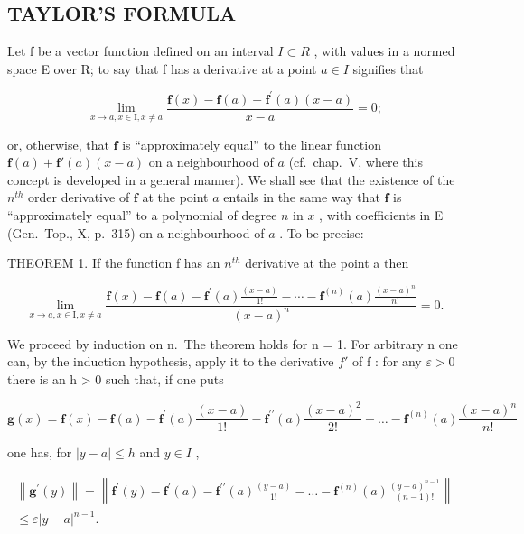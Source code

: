 \subsection{TAYLOR'S FORMULA}

Let f be a vector function defined on an interval \(I \subset R\) , with values in a normed space E over R; to say that f has a derivative at a point \(a \in I\) signifies that

\[
\lim _ {x \to a, x \in \mathrm{I}, x \neq a} \frac {\mathbf {f} (x) - \mathbf {f} (a) - \mathbf {f} ^ {\prime} (a) (x - a)}{x - a} = 0;\tag{6}
\]

or, otherwise, that \(\mathbf{f}\) is ``approximately equal'' to the linear function \(\mathbf{f}(a) + \mathbf{f}'(a)(x - a)\) on a neighbourhood of \(a\) (cf.~chap.~V, where this concept is developed in a general manner). We shall see that the existence of the \(n^{th}\) order derivative of \(\mathbf{f}\) at the point \(a\) entails in the same way that \(\mathbf{f}\) is ``approximately equal'' to a polynomial of degree \(n\) in \(x\) , with coefficients in E (Gen.~Top., X, p.~315) on a neighbourhood of \(a\) . To be precise:

THEOREM 1. If the function f has an \(n^{th}\) derivative at the point a then

\[
\lim _ {x \to a, x \in \mathrm{I}, x \neq a} \frac {\mathbf {f} (x) - \mathbf {f} (a) - \mathbf {f} ^ {\prime} (a) \frac {(x - a)}{1 !} - \cdots - \mathbf {f} ^ {(n)} (a) \frac {(x - a) ^ {n}}{n !}}{(x - a) ^ {n}} = 0.\tag{7}
\]

We proceed by induction on n.~The theorem holds for n = 1. For arbitrary n one can, by the induction hypothesis, apply it to the derivative \(f'\) of f : for any \(\varepsilon > 0\) there is an h \textgreater{} 0 such that, if one puts

\[
\mathbf {g} (x) = \mathbf {f} (x) - \mathbf {f} (a) - \mathbf {f} ^ {\prime} (a) \frac {(x - a)}{1 !} - \mathbf {f} ^ {\prime \prime} (a) \frac {(x - a) ^ {2}}{2 !} - \dots - \mathbf {f} ^ {(n)} (a) \frac {(x - a) ^ {n}}{n !}
\]

one has, for \(|y - a| \leqslant h\) and \(y \in I\) ,

\[
\begin{array}{l} \left\| \mathbf {g} ^ {\prime} (y) \right\| = \left\| \mathbf {f} ^ {\prime} (y) - \mathbf {f} ^ {\prime} (a) - \mathbf {f} ^ {\prime \prime} (a) \frac {(y - a)}{1 !} - \dots - \mathbf {f} ^ {(n)} (a) \frac {(y - a) ^ {n - 1}}{(n - 1) !} \right\| \\ \leqslant \varepsilon | y - a | ^ {n - 1}. \end{array}
\]

